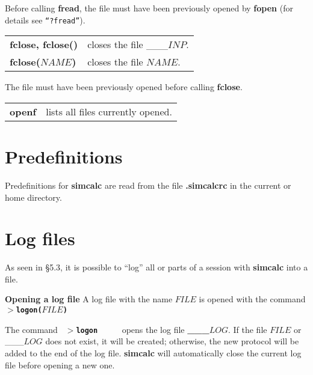 \leer
Before calling {\bf fread}, the file must have been previously opened by {\bf fopen}
(for details see {\tt ``?fread''}).

\leer
\begin{tabular}{p{1.2in}p{3.96in}}
{\bf fclose, fclose()} &
closes the file \_\_\_$INP$.\\

{\bf fclose($NAME$)} &
closes the file $NAME$.
\end{tabular}

\leer
The file must have been previously opened before calling {\bf fclose}.

\leer
\begin{tabular}{p{1.2in}p{3.96in}}
{\bf openf} &
lists all files currently opened.
\end{tabular}


\section{Predefinitions}

Predefinitions for {\bf simcalc} are read from the file {\bf .simcalcrc} in the current
or home directory.



\section{Log files}
As seen in \S 5.3, it is possible to ``log'' all or parts of a session with {\bf simcalc}
into a file.

\leer\leer
{\bf Opening a log file}
\leer
A log file with the name {\bf $FILE$} is opened with the command
\leer
{\tt
  {\bf $>$logon($FILE$)}\ \ \care
}

The command
\leer
{\tt
  {\bf $>$logon}\ \   \care {}\Spp{}\ \   \care
}
\leer
opens the log file {\bf \_\_\_$LOG$}. If the file $FILE$ or \_\_\_$LOG$ does not exist,
it will be created; other\-wise, the new protocol will be added to the end of the log file.
{\bf simcalc} will au\-to\-mati\-cally close the current log file before opening a new one.

